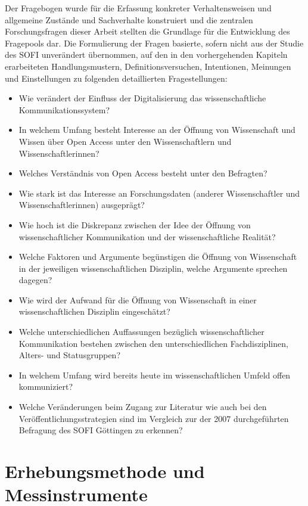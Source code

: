 Der Fragebogen wurde für die Erfassung konkreter Verhaltensweisen und allgemeine Zustände und Sachverhalte \cite{Raab-Steiner_2012} konstruiert und die zentralen Forschungsfragen dieser Arbeit stellten die Grundlage für die Entwicklung des Fragepools dar. Die Formulierung der Fragen basierte, sofern nicht aus der Studie des SOFI unverändert übernommen, auf den in den vorhergehenden Kapiteln erarbeiteten Handlungsmustern, Definitionsversuchen, Intentionen, Meinungen und Einstellungen zu folgenden detaillierten Fragestellungen:
\begin{itemize}
\item Wie verändert der Einfluss der Digitalisierung das wissenschaftliche Kommunikationssystem?
\item In welchem Umfang besteht Interesse an der Öffnung von Wissenschaft und Wissen über Open Access unter den Wissenschaftlern und Wissenschaftlerinnen?
\item Welches Verständnis von Open Access besteht unter den Befragten?
\item Wie stark ist das Interesse an Forschungsdaten (anderer Wissenschaftler und Wissenschaftlerinnen) ausgeprägt?
\item Wie hoch ist die Diskrepanz zwischen der Idee der Öffnung von wissenschaftlicher Kommunikation und der wissenschaftliche Realität?
\item Welche Faktoren und Argumente begünstigen die Öffnung von Wissenschaft in der jeweiligen wissenschaftlichen Disziplin, welche Argumente sprechen dagegen?
\item Wie wird der Aufwand für die Öffnung von Wissenschaft in einer wissenschaftlichen Disziplin eingeschätzt?
\item Welche unterschiedlichen Auffassungen bezüglich wissenschaftlicher Kommunikation bestehen zwischen den unterschiedlichen Fachdisziplinen, Alters- und Statusgruppen?
\item In welchem Umfang wird bereits heute im wissenschaftlichen Umfeld offen kommuniziert?
\item Welche Veränderungen beim Zugang zur Literatur wie auch bei den Veröffentlichungsstrategien sind im Vergleich zur der 2007 durchgeführten Befragung des SOFI Göttingen zu erkennen?
\end{itemize}

\section{Erhebungsmethode und Messinstrumente}

